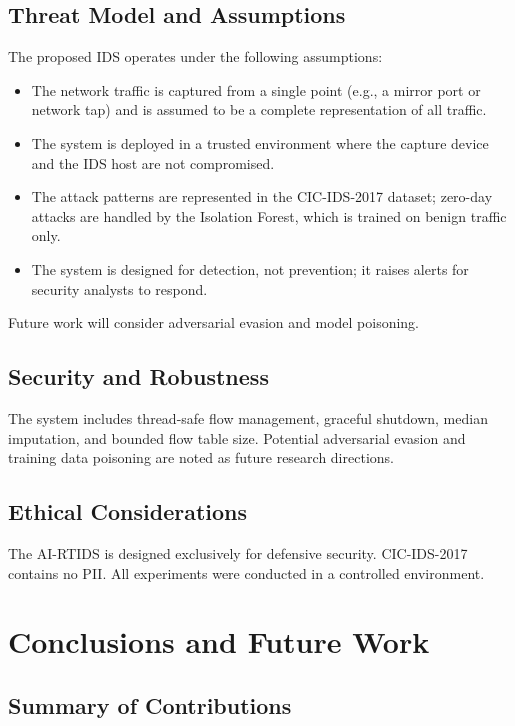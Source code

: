 \documentclass[12pt,a4paper]{article}
\begin{document}
\subsection{Threat Model and Assumptions}

The proposed IDS operates under the following assumptions:
\begin{itemize}
    \item The network traffic is captured from a single point (e.g., a mirror port or network tap) and is assumed to be a complete representation of all traffic.
    \item The system is deployed in a trusted environment where the capture device and the IDS host are not compromised.
    \item The attack patterns are represented in the CIC-IDS-2017 dataset; zero-day attacks are handled by the Isolation Forest, which is trained on benign traffic only.
    \item The system is designed for detection, not prevention; it raises alerts for security analysts to respond.
\end{itemize}
Future work will consider adversarial evasion and model poisoning.

\subsection{Security and Robustness}
The system includes thread-safe flow management, graceful shutdown, median imputation, and bounded flow table size. Potential adversarial evasion and training data poisoning are noted as future research directions.

\subsection{Ethical Considerations}
The AI-RTIDS is designed exclusively for defensive security. CIC-IDS-2017 contains no PII. All experiments were conducted in a controlled environment.

\section{Conclusions and Future Work}

\subsection{Summary of Contributions}
\end{document}
